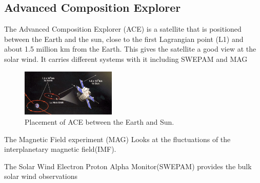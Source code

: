 \subsection{Advanced Composition Explorer}

The Advanced Composition Explorer (ACE) is a satellite that is positioned between the Earth and the sun, close to the first Lagrangian point (L1) and about 1.5 million km from the Earth. This gives the satellite a good view at the solar wind. It carries different systems with it including SWEPAM and MAG
\begin{figure} 
\vspace{-20pt}
  \begin{center}
    \includegraphics[width=0.4\textwidth]{Figures/ACE/ace_l1.png}
    \caption{Placement of ACE between the Earth and Sun.}
    \label{fig:ACE}
  \end{center}
  \vspace{-20pt}
  \vspace{1pt}
\end{figure}

The Magnetic Field experiment (MAG)
Looks at the fluctuations of the interplanetary magnetic field(IMF). 

The Solar Wind Electron Proton Alpha Monitor(SWEPAM) provides the bulk solar wind observations 